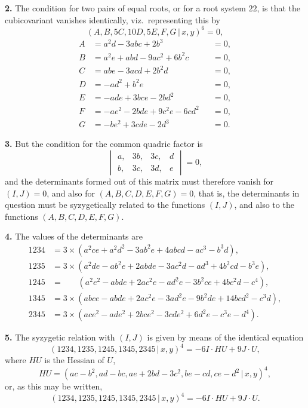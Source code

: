 \documentclass[11pt,a4paper]{article}
\begin{document}
\textbf{2.} The condition for two pairs of equal roots, or for a root system $22$, is that the cubicovariant vanishes identically, viz.\ representing this by
\[
(A, B, 5C, 10D, 5E, F, G \,\vert\, x, y)^6 = 0,
\]
\begin{align*}
A &= a^2d - 3abc + 2b^3 &&= 0, \\
B &= a^2e + abd - 9ac^2 + 6b^2c &&= 0, \\
C &= abe - 3acd + 2b^2d &&= 0, \\
D &= -ad^2 + b^2e &&= 0, \\
E &= -ade + 3bce - 2bd^2 &&= 0, \\
F &= -ae^2 - 2bde + 9c^2e - 6cd^2 &&= 0, \\
G &= -be^2 + 3cde - 2d^3 &&= 0.
\end{align*}

\textbf{3.} But the condition for the common quadric factor is
\[
\begin{vmatrix}
a, & 3b, & 3c, & d \\
b, & 3c, & 3d, & e
\end{vmatrix} = 0,
\]
and the determinants formed out of this matrix must therefore vanish for $(I,J)=0$, and also for $(A,B,C,D,E,F,G)=0$, that is, the determinants in question must be syzygetically related to the functions $(I,J)$, and also to the functions $(A,B,C,D,E,F,G)$.

\textbf{4.} The values of the determinants are
\begin{align*}
1234 &= 3 \times (a^2ce + a^2d^2 - 3ab^2e + 4abcd - ac^3 - b^3d), \\
1235 &= 3 \times (a^2de - ab^2e + 2abde - 3ac^2d - ad^3 + 4b^2cd - b^3e), \\
1245 &= \phantom{3 \times\,} (a^2e^2 - abde + 2ac^2e - ad^2e - 3b^2ce + 4bc^2d - c^4), \\
1345 &= 3 \times (abce - abde + 2ac^2e - 3ad^2e - 9b^2de + 14bcd^2 - c^3d), \\
2345 &= 3 \times (ace^2 - ade^2 + 2bce^2 - 3cde^2 + 6d^2e - c^3e - d^4).
\end{align*}

\textbf{5.} The syzygetic relation with $(I,J)$ is given by means of the identical equation
\[
(1234, 1235, 1245, 1345, 2345 \,\vert\, x, y)^4 = -6I \cdot HU + 9J \cdot U,
\]
where $HU$ is the Hessian of $U$,
\[
HU = (ac - b^2, ad - bc, ae + 2bd - 3c^2, be - cd, ce - d^2 \,\vert\, x, y)^4,
\]
or, as this may be written,
\[
(1234, 1235, 1245, 1345, 2345 \,\vert\, x, y)^4 = -6I \cdot HU + 9J \cdot U.
\]
\end{document}
